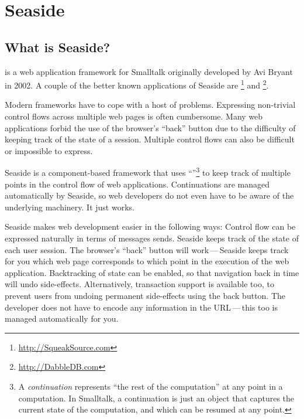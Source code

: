 \documentclass[a4paper,10pt,twoside]{book}
\begin{document}
	\sloppy
\fi
\chapter{Seaside}
\label{cha:seaside}

\section{What is Seaside?}

 is a web application framework for Smalltalk originally developed by Avi Bryant in 2002.
A couple of the better known applications of Seaside are \footnote{\url{http://SqueakSource.com}} and \footnote{\url{http://DabbleDB.com}}.

Modern  frameworks have to cope with a host of problems. Expressing non-trivial control flows across multiple web pages is often cumbersome. Many web applications forbid the use of the browser's ``back'' button due to the difficulty of keeping track of the state of a session. Multiple control flows can also be difficult or impossible to express.

Seaside is a component-based framework that uses ``''\footnote{A \emph{continuation} represents ``the rest of the computation'' at any point in a computation. In Smalltalk, a continuation is just an object that captures the current state of the computation, and which can be resumed at any point.} to keep track of multiple points in the control flow of web applications. Continuations are managed automatically by Seaside, so web developers do not even have to be aware of the underlying machinery. It just works.

Seaside makes web development easier in the following ways:
Control flow can be expressed naturally in terms of messages sends.
Seaside keeps track of the state of each user session.
The browser's ``back'' button will work\,---\,Seaside keeps track for you which web page corresponds to which point in the execution of the web application.
Backtracking of state can be enabled, so that navigation back in time will undo side-effects.
Alternatively, transaction support is available too, to prevent users from undoing permanent side-effects using the back button.
The developer does not have to encode any information in the URL\,---\,this too is managed automatically for you.
\end{document}
